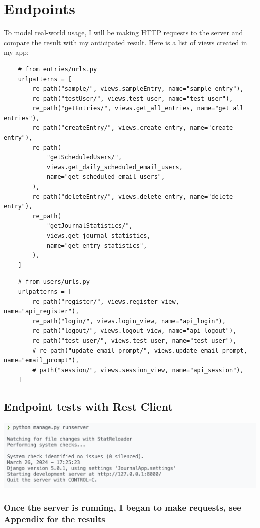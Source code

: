 \section{Endpoints}
To model real-world usage, I will be making HTTP requests to the server and compare the result with my anticipated result. Here is a list of views created in my app:

\begin{verbatim}
    # from entries/urls.py
    urlpatterns = [
        re_path("sample/", views.sampleEntry, name="sample entry"),
        re_path("testUser/", views.test_user, name="test user"),
        re_path("getEntries/", views.get_all_entries, name="get all entries"),
        re_path("createEntry/", views.create_entry, name="create entry"),
        re_path(
            "getScheduledUsers/",
            views.get_daily_scheduled_email_users,
            name="get scheduled email users",
        ),
        re_path("deleteEntry/", views.delete_entry, name="delete entry"),
        re_path(
            "getJournalStatistics/",
            views.get_journal_statistics,
            name="get entry statistics",
        ),
    ]
\end{verbatim}


\begin{verbatim}
    # from users/urls.py
    urlpatterns = [
        re_path("register/", views.register_view, name="api_register"),
        re_path("login/", views.login_view, name="api_login"),
        re_path("logout/", views.logout_view, name="api_logout"),
        re_path("test_user/", views.test_user, name="test_user"),
        # re_path("update_email_prompt/", views.update_email_prompt, name="email_prompt"),
        # path("session/", views.session_view, name="api_session"),
    ]
\end{verbatim}
\subsection{Endpoint tests with Rest Client}
\includegraphics[width=\textwidth]{Assets/django_running.png}

\subsubsection{Once the server is running, I began to make requests, see Appendix for the results}
